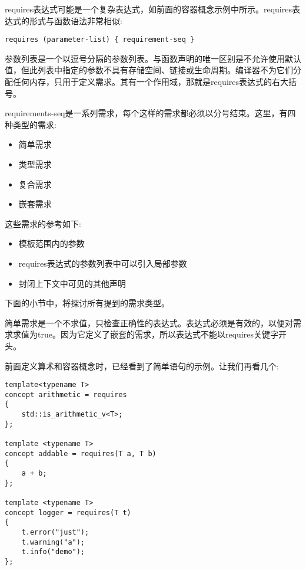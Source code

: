 
requires表达式可能是一个复杂表达式，如前面的容器概念示例中所示。requires表达式的形式与函数语法非常相似:

\begin{lstlisting}[style=styleCXX]
requires (parameter-list) { requirement-seq }
\end{lstlisting}

参数列表是一个以逗号分隔的参数列表。与函数声明的唯一区别是不允许使用默认值，但此列表中指定的参数不具有存储空间、链接或生命周期。编译器不为它们分配任何内存，只用于定义需求。其有一个作用域，那就是requires表达式的右大括号。

requirements-seq是一系列需求，每个这样的需求都必须以分号结束。这里，有四种类型的需求:

\begin{itemize}
\item
简单需求

\item
类型需求

\item
复合需求

\item
嵌套需求
\end{itemize}

这些需求的参考如下:

\begin{itemize}
\item
模板范围内的参数

\item
requires表达式的参数列表中可以引入局部参数

\item
封闭上下文中可见的其他声明
\end{itemize}

下面的小节中，将探讨所有提到的需求类型。


简单需求是一个不求值，只检查正确性的表达式。表达式必须是有效的，以便对需求求值为true。因为它定义了嵌套的需求，所以表达式不能以requires关键字开头。

前面定义算术和容器概念时，已经看到了简单语句的示例。让我们再看几个:

\begin{lstlisting}[style=styleCXX]
template<typename T>
concept arithmetic = requires
{
	std::is_arithmetic_v<T>;
};

template <typename T>
concept addable = requires(T a, T b)
{
	a + b;
};

template <typename T>
concept logger = requires(T t)
{
	t.error("just");
	t.warning("a");
	t.info("demo");
};
\end{lstlisting}

